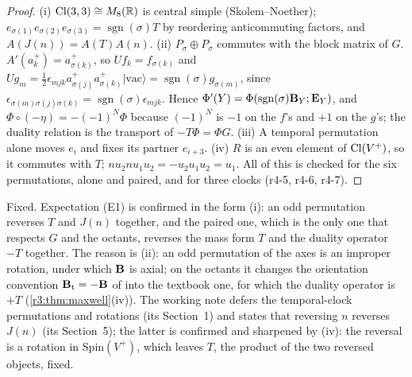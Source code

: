 \begin{proof}
(i) $\mathrm{Cl}(3,3)\cong M_8(\mathbb{R})$ is central simple (Skolem--Noether); $e_{\sigma(1)}e_{\sigma(2)}e_{\sigma(3)}=\operatorname{sgn}(\sigma)T$ by reordering anticommuting factors,
and $A(J(n))=A(T)A(n)$. (ii) $P_\sigma\oplus P_\sigma$ commutes with the block matrix of $G$. $A'(a^+_k)=a^+_{\sigma(k)}$, so $Uf_k=f_{\sigma(k)}$ and
$Ug_m=\tfrac12\epsilon_{mjk}a^+_{\sigma(j)}a^+_{\sigma(k)}|\mathrm{vac}\rangle=\operatorname{sgn}(\sigma)g_{\sigma(m)}$, since $\epsilon_{\sigma(m)\sigma(j)\sigma(k)}=\operatorname{sgn}(\sigma)\epsilon_{mjk}$.
Hence $\Phi'(Y)=\Phi(\operatorname{sgn}(\sigma)\mathbf B_Y;\mathbf E_Y)$, and $\Phi\circ(-\eta)=-(-1)^N\Phi$ because $(-1)^N$ is $-1$ on the $f$'s and $+1$ on the $g$'s; the duality
relation is the transport of $-T\Phi=\Phi G$. (iii) A temporal permutation alone moves $e_i$ and fixes its partner $e_{i+3}$. (iv) $R$ is an even
element of $\mathrm{Cl}(V^+)$, so it commutes with $T$; $nu_2nu_1u_2=-u_2u_1u_2=u_1$. All of this is checked for the six permutations, alone and paired, and
for three clocks (r4-5, r4-6, r4-7).
\end{proof}

Fixed. Expectation (E1) is confirmed in the form (i): an odd permutation reverses $T$ and $J(n)$ together, and the paired one, which is
the only one that respects $G$ and the octants, reverses the mass form $T$ and the duality operator $-T$ together. The reason is (ii): an odd
permutation of the axes is an improper rotation, under which $\mathbf B$ is axial; on the octants it changes the orientation convention $\mathbf B_{\rm t}=-\mathbf B$
of \cite{ES17} into the textbook one, for which the duality operator is $+T$ (\cref{r3:thm:maxwell}(iv)). The working note \cite{FMB} defers the
temporal-clock permutations and rotations (its Section~1) and states that reversing $n$ reverses $J(n)$ (its Section~5); the latter is confirmed and
sharpened by (iv): the reversal is a rotation in $\mathrm{Spin}(V^+)$, which leaves $T$, the product of the two reversed objects, fixed.

